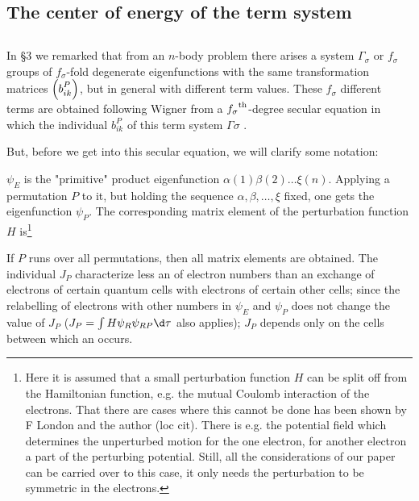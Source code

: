 \begin{paper}{1}
\section{The center of energy of the term system}
\subsection{} In \S3 we remarked that from an $n$-body problem there arises a system $\Gamma_\sigma$ or $f_\sigma$ groups of $f_\sigma$-fold degenerate eigenfunctions with the same transformation matrices $\Aikp{b}{ik}{P}$, but in general with different term values. These $f_\sigma$ different terms are obtained following Wigner from a ${f_\sigma}^\text{th}$-degree secular equation in which the individual $b_{ik}^P$ of this term system $\Gamma\sigma$ .

But, before we get into this secular equation, we will clarify some notation:

$\psi_E$ is the "primitive" product eigenfunction $\alpha(1)\beta(2)\dots\xi(n)$. Applying a permutation $P$ to it, but holding the sequence $\alpha,\beta,\dots,\xi$ fixed, one gets the eigenfunction $\psi_P$. The corresponding matrix element of the perturbation function $H$ is\footnote{Here it is assumed that a small perturbation function $H$ can be split off from the Hamiltonian function, e.g. the mutual Coulomb interaction of the electrons. That there are cases where this cannot be done has been shown by F London and the author (loc cit). There is e.g. the potential field which determines the unperturbed motion for the one electron, for another electron a part of the perturbing potential. Still, all the considerations of our paper can be carried over to this case, it only needs the perturbation to be symmetric in the electrons.}

If $P$ runs over all permutations, then all matrix elements are obtained. The individual $J_P$ characterize less an  of electron numbers than an exchange of electrons of certain quantum cells with electrons of certain other cells; since the relabelling of electrons with other numbers in $\psi_E$ and $\psi_P$ does not change the value of $J_P$ ($J_P=\int H\psi_R\psi_{RP}\d\tau$ also applies); $J_P$ depends only on the cells between which an  occurs.


\end{paper}
